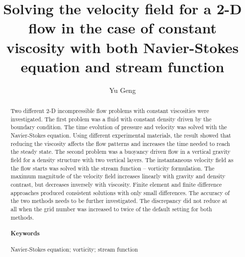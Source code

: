 \documentclass[12pt]{article}
\title{Solving the velocity field for a 2-D flow in the case of constant viscosity with both Navier-Stokes equation and stream function}
\author{Yu Geng}
\date{}
\numberwithin{figure}{section}  %
\numberwithin{equation}{section}  %
\begin{document}
\maketitle
\begin{abstract}
	Two different 2-D incompressible flow problems with constant viscosities were investigated. The first problem was a fluid with constant density driven by the boundary condition. The time evolution of pressure and velocity was solved with the Navier-Stokes equation. Using different experimental materials, the result showed that reducing the viscosity affects the flow patterns and increases the time needed to reach the steady state. The second problem was a buoyancy driven flow in a vertical gravity field for a density structure with two vertical layers. The instantaneous velocity field as the flow starts was solved with the stream function – vorticity formulation. The maximum magnitude of the velocity field increases linearly with gravity and density contrast, but decreases inversely with viscosity. Finite element and finite difference approaches produced consistent solutions with only small differences. The accuracy of the two methods needs to be further investigated. The discrepancy did not reduce at all when the grid number was increased to twice of the default setting for both methods.
	\paragraph{Keywords}Navier-Stokes equation; vorticity; stream function
\end{abstract}
\newpage

\tableofcontents
\newpage
{}
\end{document}
